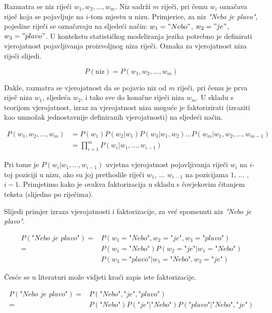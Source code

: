 \documentclass[times, utf8, diplomski, numeric]{fer}
\begin{document}
Razmatra se niz riječi $w_1, w_2, ... , w_m$. Niz sadrži $m$ riječi, pri čemu $w_i$ označava riječ koja se pojavljuje na $i$-tom mjestu u nizu. Primjerice, za niz \textit{"Nebo je plavo"}, pojedine riječi se označavaju na sljedeći način: $w_1="Nebo"$, $w_2="je"$, $w_3="plavo"$. U kontekstu statističkog modeliranja jezika potrebno je definirati vjerojatnost pojavljivanja proizvoljnog niza riječi. Oznaka za vjerojatnost niza riječi slijedi.

\[
P(\text{niz}) = P(w_1, w_2, ... , w_m)
\]

Dakle, razmatra se vjerojatnost da se pojavio niz od $m$ riječi, pri čemu je prva riječ niza $w_1$, sljedeća $w_2$, i tako sve do konačne riječi niza $w_m$. U skladu s teorijom vjerojatnost, izraz za vjerojatnost niza moguće je faktorizirati (izraziti kao umnožak jednostavnije definiranih vjerojatnosti) na sljedeći način.

\begin{align*}
P(w_1, w_2, ... , w_m)
  &= P(w_1) P(w_2 | w_1) P(w_3 | w_1, w_2) ... P(w_m | w_1, w_2, ... , w_{m - 1 }) \\
  &= \prod_{i = 1}^m{P(w_i|w_1, ... , w_{i - 1})}
\end{align*}

Pri tome je $P(w_i | w_1, ... , w_{i - 1})$ uvjetna vjerojatnost pojavljivanja riječi $w_i$ na $i$-toj poziciji u nizu, ako su joj prethodile riječi $w_1$, ... $w_{i - 1}$ na pozicijama $1$, ... , $i - 1$. Primjetimo kako je ovakva faktorizacija u skladu s čovjekovim čitanjem teksta (slijedno po riječima).

Slijedi primjer izraza vjerojatnosti i faktorizacije, za već spomenuti niz \textit{"Nebo je plavo"}.

\begin{align*}
P(\textit{"Nebo je plavo"})
  = &P(w_1=\textit{"Nebo"}, w_2=\textit{"je"}, w_3=\textit{"plavo"}) \\
  = &P(w_1=\textit{"Nebo"}) P(w_2=\textit{"je"} | w_1=\textit{"Nebo"}) \\
  &P(w_3=\textit{"plavo"} | w_1=\textit{"Nebo"}, w_2=\textit{"je"})
\end{align*}

Česće se u literaturi može vidjeti kraći zapis iste faktorizacije.

\begin{align*}
P(\textit{"Nebo je plavo"})
  = &P(\textit{"Nebo"}, \textit{"je"}, \textit{"plavo"}) \\
  = &P(\textit{"Nebo"}) P(\textit{"je"} | \textit{"Nebo"}) P(\textit{"plavo"} | \textit{"Nebo"}, \textit{"je"})
\end{align*}
\end{document}
